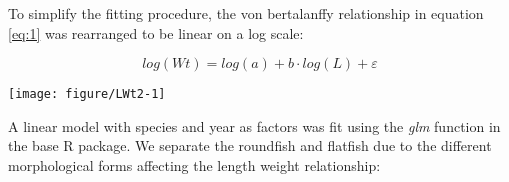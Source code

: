 \documentclass[12pt]{article}\usepackage[]{graphicx}\usepackage[]{color}
\makeatletter
\def\maxwidth{ %
  \ifdim\Gin@nat@width>\linewidth
    \linewidth
  \else
    \Gin@nat@width
  \fi
}
\newenvironment{knitrout}{}{} %
\makeatother
\begin{document}
To simplify the fitting procedure, the von bertalanffy relationship in equation
\ref{eq:1} was rearranged to be linear on a log scale:

\begin{equation}\label{eq:2}
	log(Wt) = log(a) + b \cdot log(L) + \varepsilon
\end{equation} 

\vspace{1cm}

\begin{knitrout}\footnotesize
{}\color{fgcolor}
\texttt{[image: figure/LWt2-1]} 

\end{knitrout}

A linear model with species and year as factors was fit using the \textit{glm}
function in the base R package. We separate the roundfish and flatfish due to
the different morphological forms affecting the length weight relationship:
\end{document}
